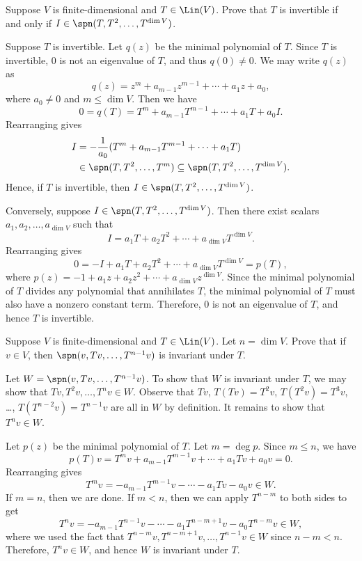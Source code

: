 \begin{exercise}
Suppose $V$ is finite-dimensional and $T\in\Lin(V)$. Prove that $T$ is
invertible if and only if $I\in\spn(T,T^2,\dots,T^{\dim V})$.
\end{exercise}
\begin{solution}
Suppose $T$ is invertible. Let $q(z)$ be the minimal polynomial of $T$. Since
$T$ is invertible, $0$ is not an eigenvalue of $T$, and thus $q(0)\ne0$. We
may write $q(z)$ as
\[ q(z)=z^m+a_{m-1}z^{m-1}+\cdots+a_1z+a_0, \]
where $a_0\ne0$ and $m\le\dim V$. Then we have
\[ 0=q(T)=T^m+a_{m-1}T^{m-1}+\cdots+a_1T+a_0I. \]
Rearranging gives
\begin{align*}
I &= -\frac{1}{a_0}(T^m+a_{m-1}T^{m-1}+\cdots+a_1T)\\
  &\in \spn(T,T^2,\dots,T^m)\subseteq\spn(T,T^2,\dots,T^{\dim V}).
\end{align*}
Hence, if $T$ is invertible, then $I\in\spn(T,T^2,\dots,T^{\dim V})$.

Conversely, suppose $I\in\spn(T,T^2,\dots,T^{\dim V})$. Then there exist
scalars $a_1,a_2,\allowbreak\dots,a_{\dim V}$ such that
\[ I=a_1T+a_2T^2+\cdots+a_{\dim V}T^{\dim V}. \]
Rearranging gives
\[ 0=-I+a_1T+a_2T^2+\cdots+a_{\dim V}T^{\dim V}=p(T), \]
where $p(z)=-1+a_1z+a_2z^2+\cdots+a_{\dim V}z^{\dim V}$. Since the minimal
polynomial of $T$ divides any polynomial that annihilates $T$, the minimal
polynomial of $T$ must also have a nonzero constant term. Therefore, $0$ is
not an eigenvalue of $T$, and hence $T$ is invertible.
\end{solution}

\begin{exercise}
Suppose $V$ is finite-dimensional and $T\in\Lin(V)$. Let $n=\dim V$. Prove
that if $v\in V$, then $\spn(v,Tv,\dots,T^{n-1}v)$ is invariant under $T$.
\end{exercise}
\begin{solution}
Let $W=\spn(v,Tv,\dots,T^{n-1}v)$. To show that $W$ is invariant under $T$, we
may show that $Tv,T^2v,\dots,T^nv\in W$. Observe that $Tv$, $T(Tv)=T^2v$,
$T(T^2v)=T^3v$, \dots, $T(T^{n-2}v)=T^{n-1}v$ are all in $W$ by definition. It
remains to show that $T^nv\in W$.

Let $p(z)$ be the minimal polynomial of $T$. Let $m=\deg p$. Since $m\le n$,
we have
\[ p(T)v=T^mv+a_{m-1}T^{m-1}v+\cdots+a_1Tv+a_0v=0. \]
Rearranging gives
\[ T^mv=-a_{m-1}T^{m-1}v-\cdots-a_1Tv-a_0v\in W. \]
If $m=n$, then we are done. If $m<n$, then we can apply $T^{n-m}$ to both
sides to get
\[ T^nv=-a_{m-1}T^{n-1}v-\cdots-a_1T^{n-m+1}v-a_0T^{n-m}v\in W, \]
where we used the fact that $T^{n-m}v,T^{n-m+1}v,\dots,T^{n-1}v\in W$ since
$n-m<n$. Therefore, $T^nv\in W$, and hence $W$ is invariant under $T$.
\end{solution}

